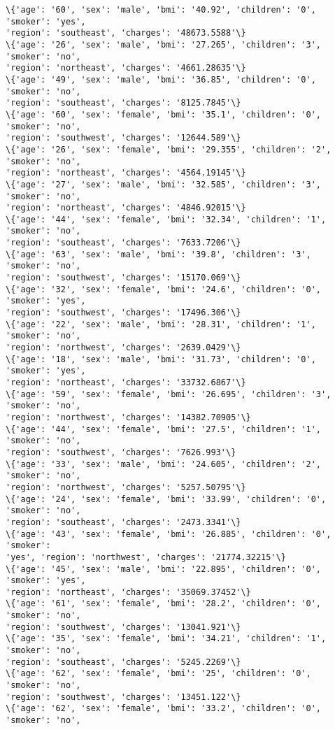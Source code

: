 \documentclass[11pt]{article}
\begin{document}
\begin{Verbatim}[commandchars=\\\{\}]
\{'age': '60', 'sex': 'male', 'bmi': '40.92', 'children': '0', 'smoker': 'yes',
'region': 'southeast', 'charges': '48673.5588'\}
\{'age': '26', 'sex': 'male', 'bmi': '27.265', 'children': '3', 'smoker': 'no',
'region': 'northeast', 'charges': '4661.28635'\}
\{'age': '49', 'sex': 'male', 'bmi': '36.85', 'children': '0', 'smoker': 'no',
'region': 'southeast', 'charges': '8125.7845'\}
\{'age': '60', 'sex': 'female', 'bmi': '35.1', 'children': '0', 'smoker': 'no',
'region': 'southwest', 'charges': '12644.589'\}
\{'age': '26', 'sex': 'female', 'bmi': '29.355', 'children': '2', 'smoker': 'no',
'region': 'northeast', 'charges': '4564.19145'\}
\{'age': '27', 'sex': 'male', 'bmi': '32.585', 'children': '3', 'smoker': 'no',
'region': 'northeast', 'charges': '4846.92015'\}
\{'age': '44', 'sex': 'female', 'bmi': '32.34', 'children': '1', 'smoker': 'no',
'region': 'southeast', 'charges': '7633.7206'\}
\{'age': '63', 'sex': 'male', 'bmi': '39.8', 'children': '3', 'smoker': 'no',
'region': 'southwest', 'charges': '15170.069'\}
\{'age': '32', 'sex': 'female', 'bmi': '24.6', 'children': '0', 'smoker': 'yes',
'region': 'southwest', 'charges': '17496.306'\}
\{'age': '22', 'sex': 'male', 'bmi': '28.31', 'children': '1', 'smoker': 'no',
'region': 'northwest', 'charges': '2639.0429'\}
\{'age': '18', 'sex': 'male', 'bmi': '31.73', 'children': '0', 'smoker': 'yes',
'region': 'northeast', 'charges': '33732.6867'\}
\{'age': '59', 'sex': 'female', 'bmi': '26.695', 'children': '3', 'smoker': 'no',
'region': 'northwest', 'charges': '14382.70905'\}
\{'age': '44', 'sex': 'female', 'bmi': '27.5', 'children': '1', 'smoker': 'no',
'region': 'southwest', 'charges': '7626.993'\}
\{'age': '33', 'sex': 'male', 'bmi': '24.605', 'children': '2', 'smoker': 'no',
'region': 'northwest', 'charges': '5257.50795'\}
\{'age': '24', 'sex': 'female', 'bmi': '33.99', 'children': '0', 'smoker': 'no',
'region': 'southeast', 'charges': '2473.3341'\}
\{'age': '43', 'sex': 'female', 'bmi': '26.885', 'children': '0', 'smoker':
'yes', 'region': 'northwest', 'charges': '21774.32215'\}
\{'age': '45', 'sex': 'male', 'bmi': '22.895', 'children': '0', 'smoker': 'yes',
'region': 'northeast', 'charges': '35069.37452'\}
\{'age': '61', 'sex': 'female', 'bmi': '28.2', 'children': '0', 'smoker': 'no',
'region': 'southwest', 'charges': '13041.921'\}
\{'age': '35', 'sex': 'female', 'bmi': '34.21', 'children': '1', 'smoker': 'no',
'region': 'southeast', 'charges': '5245.2269'\}
\{'age': '62', 'sex': 'female', 'bmi': '25', 'children': '0', 'smoker': 'no',
'region': 'southwest', 'charges': '13451.122'\}
\{'age': '62', 'sex': 'female', 'bmi': '33.2', 'children': '0', 'smoker': 'no',

\end{Verbatim}
\end{document}
